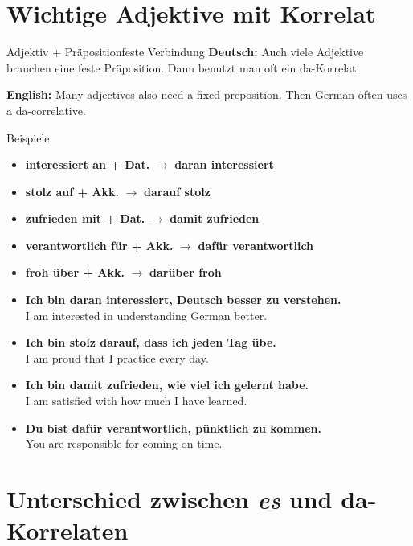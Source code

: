 \documentclass[a4paper,11pt]{article}
\newcommand{\GermanText}[1]{\textbf{Deutsch: }#1\par}
\newcommand{\EnglishText}[1]{{\small\color{SoftGray}\textbf{English: }#1\par}}
\newcommand{\ExampleItem}[2]{\item \textbf{#1}\\{\small\color{SoftGray}#2}}
\begin{document}
    
    \section{Wichtige Adjektive mit Korrelat}
        
        \begin{grammarentry}{Adjektiv + Präposition}{feste Verbindung}
            \GermanText{Auch viele Adjektive brauchen eine feste Präposition. Dann benutzt man oft ein da-Korrelat.}
            \EnglishText{Many adjectives also need a fixed preposition. Then German often uses a da-correlative.}
            
            Beispiele:
            \begin{itemize}
                \item \textbf{interessiert an + Dat.} $\rightarrow$ \textbf{daran interessiert}
                \item \textbf{stolz auf + Akk.} $\rightarrow$ \textbf{darauf stolz}
                \item \textbf{zufrieden mit + Dat.} $\rightarrow$ \textbf{damit zufrieden}
                \item \textbf{verantwortlich für + Akk.} $\rightarrow$ \textbf{dafür verantwortlich}
                \item \textbf{froh über + Akk.} $\rightarrow$ \textbf{darüber froh}
            \end{itemize}
        \end{grammarentry}
        
        \begin{exbox}
            \begin{itemize}
                \ExampleItem{Ich bin daran interessiert, Deutsch besser zu verstehen.}{I am interested in understanding German better.}
                \ExampleItem{Ich bin stolz darauf, dass ich jeden Tag übe.}{I am proud that I practice every day.}
                \ExampleItem{Ich bin damit zufrieden, wie viel ich gelernt habe.}{I am satisfied with how much I have learned.}
                \ExampleItem{Du bist dafür verantwortlich, pünktlich zu kommen.}{You are responsible for coming on time.}
            \end{itemize}
        \end{exbox}
    
    
    \section{Unterschied zwischen \textit{es} und da-Korrelaten}
        
\end{document}
